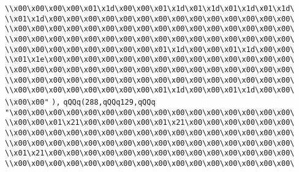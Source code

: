 \verb|\\x00\x00\x00\x00\x01\x1d\x00\x00\x01\x1d\x01\x1d\x01\x1d\x01\x1d\|\newline
\verb|\\x01\x1d\x00\x00\x00\x00\x00\x00\x00\x00\x00\x00\x00\x00\x00\x00\|\newline
\verb|\\x00\x00\x00\x00\x00\x00\x00\x00\x00\x00\x00\x00\x00\x00\x00\x00\|\newline
\verb|\\x00\x00\x00\x00\x00\x00\x00\x00\x00\x00\x00\x00\x00\x00\x00\x00\|\newline
\verb|\\x00\x00\x00\x00\x00\x00\x00\x00\x01\x1d\x00\x00\x01\x1d\x00\x00\|\newline
\verb|\\x01\x1e\x00\x00\x00\x00\x00\x00\x00\x00\x00\x00\x00\x00\x00\x00\|\newline
\verb|\\x00\x00\x00\x00\x00\x00\x00\x00\x00\x00\x00\x00\x00\x00\x00\x00\|\newline
\verb|\\x00\x00\x00\x00\x00\x00\x00\x00\x00\x00\x00\x00\x00\x00\x00\x00\|\newline
\verb|\\x00\x00\x00\x00\x00\x00\x00\x00\x01\x1d\x00\x00\x01\x1d\x00\x00\|\newline
\verb|\\x00\x00"|\newline
\verb|),|\newline
\verb|qQQq(288,qQQq129,qQQq|\newline
\verb|"\x00\x00\x00\x00\x00\x00\x00\x00\x00\x00\x00\x00\x00\x00\x00\x00\|\newline
\verb|\\x00\x00\x01\x21\x00\x00\x00\x00\x01\x21\x00\x00\x00\x00\x00\x00\|\newline
\verb|\\x00\x00\x00\x00\x00\x00\x00\x00\x00\x00\x00\x00\x00\x00\x00\x00\|\newline
\verb|\\x00\x00\x00\x00\x00\x00\x00\x00\x00\x00\x00\x00\x00\x00\x00\x00\|\newline
\verb|\\x01\x21\x00\x00\x00\x00\x00\x00\x00\x00\x00\x00\x00\x00\x00\x00\|\newline
\verb|\\x00\x00\x00\x00\x00\x00\x00\x00\x00\x00\x00\x00\x00\x00\x00\x00\|\newline
